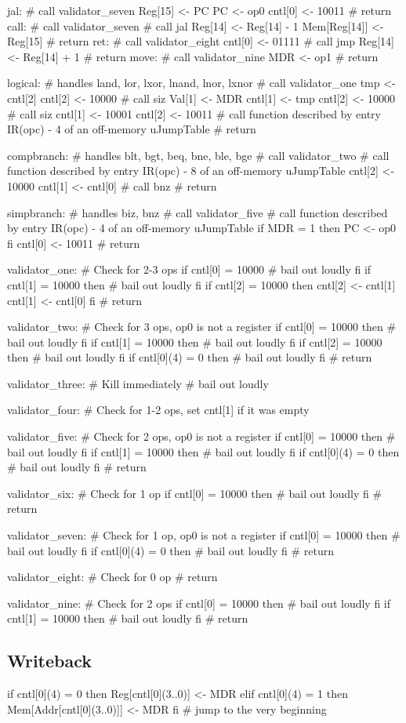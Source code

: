 \documentclass[12pt]{article}
\begin{document}
\begin{verbatimtab}
jal:
    # call validator_seven
    Reg[15] <- PC    
    PC <- op0
    cntl[0] <- 10011
    # return
call:
	# call validator_seven
	# call jal
	Reg[14] <- Reg[14] - 1
	Mem[Reg[14]] <- Reg[15]
	# return
ret:
	# call validator_eight
	cntl[0] <- 01111
	# call jmp
	Reg[14] <- Reg[14] + 1
	# return
move:
    # call validator_nine
    MDR <- op1
    # return

logical: # handles land, lor, lxor, lnand, lnor, lxnor
	# call validator_one
	tmp <- cntl[2]
	cntl[2] <- 10000
	# call siz
	Val[1] <- MDR
	cntl[1] <- tmp
	cntl[2] <- 10000
	# call siz
	cntl[1] <- 10001
	cntl[2] <- 10011
	# call function described by entry IR(opc) - 4 of an off-memory uJumpTable
	# return

compbranch: # handles blt, bgt, beq, bne, ble, bge
	# call validator_two
	# call function described by entry IR(opc) - 8 of an off-memory uJumpTable
	cntl[2] <- 10000
	cntl[1] <- cntl[0]
	# call bnz
	# return

simpbranch: # handles biz, bnz
	# call validator_five
	# call function described by entry IR(opc) - 4 of an off-memory uJumpTable
	if MDR = 1 then
		PC <- op0
	fi
	cntl[0] <- 10011
	# return

validator_one:
	# Check for 2-3 ops
	if cntl[0] = 10000
		# bail out loudly
	fi
	if cntl[1] = 10000 then
		# bail out loudly
	fi
	if cntl[2] = 10000 then
		cntl[2] <- cntl[1]
		cntl[1] <- cntl[0]
	fi
	# return

validator_two:
	# Check for 3 ops, op0 is not a register
	if cntl[0] = 10000 then
		# bail out loudly
	fi
	if cntl[1] = 10000 then
		# bail out loudly
	fi
	if cntl[2] = 10000 then
		# bail out loudly
	fi
	if cntl[0](4) = 0 then
		# bail out loudly
	fi
	# return

validator_three:
	# Kill immediately
	# bail out loudly

validator_four:
	# Check for 1-2 ops, set cntl[1] if it was empty

validator_five:
	# Check for 2 ops, op0 is not a register
	if cntl[0] = 10000 then
		# bail out loudly
	fi
	if cntl[1] = 10000 then
		# bail out loudly
	fi
	if cntl[0](4) = 0 then
		# bail out loudly
	fi
	# return

validator_six:
	# Check for 1 op
	if cntl[0] = 10000 then
		# bail out loudly
	fi
	# return

validator_seven:
	# Check for 1 op, op0 is not a register
	if cntl[0] = 10000 then
		# bail out loudly
	fi
	if cntl[0](4) = 0 then
		# bail out loudly
	fi
	# return

validator_eight:
	# Check for 0 op
	# return

validator_nine:
	# Check for 2 ops
    if cntl[0] = 10000 then
        # bail out loudly
	fi
    if cntl[1] = 10000 then
        # bail out loudly
	fi
    # return
\end{verbatimtab}

\subsection{Writeback}
\begin{verbatimtab}
if cntl[0](4) = 0 then
   Reg[cntl[0](3..0)] <- MDR
elif cntl[0](4) = 1 then
   Mem[Addr[cntl[0](3..0)]] <- MDR
fi
# jump to the very beginning
\end{verbatimtab}
\end{document}
